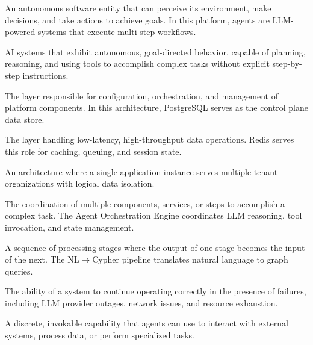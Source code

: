 \begin{description}[style=nextline,leftmargin=2cm,labelwidth=1.8cm]

\item[Agent]
An autonomous software entity that can perceive its environment, make decisions, and take actions to achieve goals. In this platform, agents are LLM-powered systems that execute multi-step workflows.

\item[Agentic AI]
AI systems that exhibit autonomous, goal-directed behavior, capable of planning, reasoning, and using tools to accomplish complex tasks without explicit step-by-step instructions.

\item[Control Plane]
The layer responsible for configuration, orchestration, and management of platform components. In this architecture, PostgreSQL serves as the control plane data store.

\item[Data Plane]
The layer handling low-latency, high-throughput data operations. Redis serves this role for caching, queuing, and session state.

\item[Multi-Tenancy]
An architecture where a single application instance serves multiple tenant organizations with logical data isolation.

\item[Orchestration]
The coordination of multiple components, services, or steps to accomplish a complex task. The Agent Orchestration Engine coordinates LLM reasoning, tool invocation, and state management.

\item[Pipeline]
A sequence of processing stages where the output of one stage becomes the input of the next. The NL$\rightarrow$Cypher pipeline translates natural language to graph queries.

\item[Resilience]
The ability of a system to continue operating correctly in the presence of failures, including LLM provider outages, network issues, and resource exhaustion.

\item[Tool]
A discrete, invokable capability that agents can use to interact with external systems, process data, or perform specialized tasks.

\end{description}

